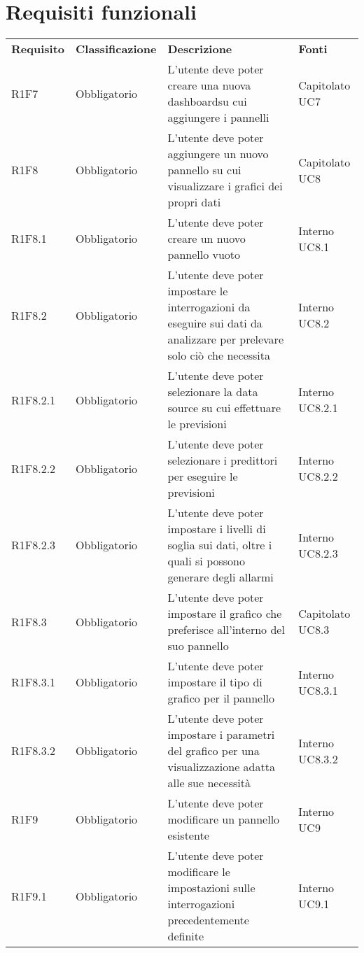 \section{Requisiti funzionali}
	\begin{longtable} {
		>{}p{24mm} 
		>{}p{32mm}
		>{}p{40mm} 
		>{}p{24.5mm}
		}
	\rowcolor{gray!50}
		\textbf{Requisito} & \textbf{Classificazione} & \textbf{Descrizione} & \textbf{Fonti} 	\TBstrut \\
		R1F7 & Obbligatorio & L'utente deve poter creare una nuova dashboard\glosp su cui aggiungere i pannelli & Capitolato UC7 \TBstrut \\ [2mm]
		R1F8 & Obbligatorio & L'utente deve poter aggiungere un nuovo pannello su cui visualizzare i grafici dei propri dati & Capitolato UC8 \TBstrut \\ [2mm]
		R1F8.1 & Obbligatorio & L'utente deve poter creare un nuovo pannello vuoto & Interno UC8.1 \TBstrut \\ [2mm]
		R1F8.2 & Obbligatorio & L'utente deve poter impostare le interrogazioni da eseguire sui dati da analizzare per prelevare solo ciò che necessita & Interno UC8.2 \TBstrut \\ [2mm]
		R1F8.2.1 & Obbligatorio & L'utente deve poter selezionare la data source su cui effettuare le previsioni & Interno UC8.2.1 \TBstrut \\ [2mm]
		R1F8.2.2 & Obbligatorio & L'utente deve poter selezionare i predittori per eseguire le previsioni & Interno UC8.2.2 \TBstrut \\ [2mm]
		R1F8.2.3 & Obbligatorio & L'utente deve poter impostare i livelli di soglia sui dati, oltre i quali si possono generare degli allarmi & Interno UC8.2.3 \TBstrut \\ [2mm]
		R1F8.3 & Obbligatorio & L'utente deve poter impostare il grafico che preferisce all'interno del suo pannello & Capitolato UC8.3 \TBstrut \\ [2mm]
		R1F8.3.1 & Obbligatorio & L'utente deve poter impostare il tipo di grafico per il pannello & Interno UC8.3.1 \TBstrut \\ [2mm]
		R1F8.3.2 & Obbligatorio & L'utente deve poter impostare i parametri del grafico per una visualizzazione adatta alle sue necessità & Interno UC8.3.2 \TBstrut \\ [2mm]
		R1F9 & Obbligatorio & L'utente deve poter modificare un pannello esistente & Interno UC9 \TBstrut \\ [2mm]
		R1F9.1 & Obbligatorio & L'utente deve poter modificare le impostazioni sulle interrogazioni precedentemente definite & Interno UC9.1 \TBstrut \\ [2mm]

\end{longtable}
